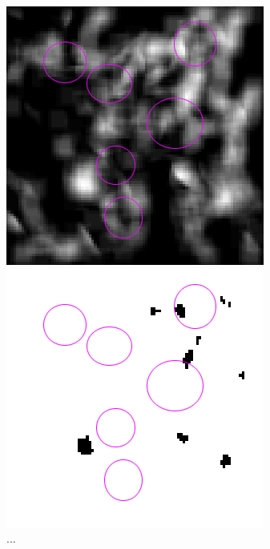 \begin{figure}[H]
	\begin{minipage}[b]{0.5\linewidth}
		\centering
		\includegraphics[scale=0.54]{files/postmethod/img/sld_res10.png}
	\end{minipage}
	\hspace{0.8cm}
	\begin{minipage}[b]{0.5\linewidth}
		\centering
		\includegraphics[scale=0.54]{files/postmethod/img/sld_res11.png}
	\end{minipage}
	\caption{...\label{fig:postmethod_sld_res7}}
\end{figure}

